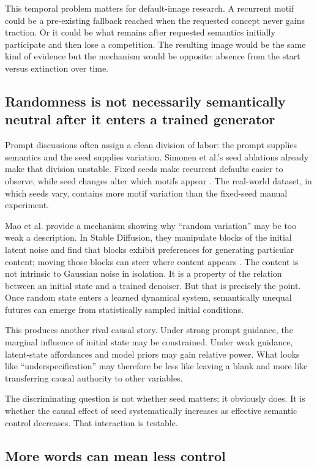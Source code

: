 \documentclass[11pt]{article}
\begin{document}
This temporal problem matters for default-image research. A recurrent motif could be a pre-existing fallback reached when the requested concept never gains traction. Or it could be what remains after requested semantics initially participate and then lose a competition. The resulting image would be the same kind of evidence but the mechanism would be opposite: absence from the start versus extinction over time.

\subsection{Randomness is not necessarily semantically neutral after it enters a trained generator}

Prompt discussions often assign a clean division of labor: the prompt supplies semantics and the seed supplies variation. Simonen et al.'s seed ablations already make that division unstable. Fixed seeds make recurrent defaults easier to observe, while seed changes alter which motifs appear \citep{Simonen2026DefaultImages}. The real-world dataset, in which seeds vary, contains more motif variation than the fixed-seed manual experiment.

Mao et al. provide a mechanism showing why ``random variation'' may be too weak a description. In Stable Diffusion, they manipulate blocks of the initial latent noise and find that blocks exhibit preferences for generating particular content; moving those blocks can steer where content appears \citep{Mao2023InitialImageEditing}. The content is not intrinsic to Gaussian noise in isolation. It is a property of the relation between an initial state and a trained denoiser. But that is precisely the point. Once random state enters a learned dynamical system, semantically unequal futures can emerge from statistically sampled initial conditions.

This produces another rival causal story. Under strong prompt guidance, the marginal influence of initial state may be constrained. Under weak guidance, latent-state affordances and model priors may gain relative power. What looks like ``underspecification'' may therefore be less like leaving a blank and more like transferring causal authority to other variables.

The discriminating question is not whether seed matters; it obviously does. It is whether the causal effect of seed systematically increases as effective semantic control decreases. That interaction is testable.

\subsection{More words can mean less control}
\end{document}
